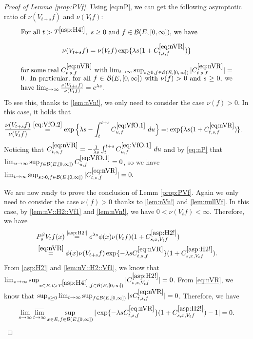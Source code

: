 \documentclass[12pt,a4paper]{amsart}
\numberwithin{equation}{section}
\theoremstyle{plain}
\theoremstyle{definition}
\theoremstyle{remark}
\begin{document}
\begin{proof}[Proof of Lemma \ref{prop:PVf}]
	Using \eqref{eq:nP}, we can get the following asymptotic ratio of $\nu(V_{t+s}f)$ and $\nu(V_tf)$:
\begin{equation} \label{eq:nVR}
\begin{minipage}{0.9\textwidth}
	For all $t> T^{\eqref{asp:H4!}},~s \geq 0$ and $f\in \mathcal B(E,[0,\infty])$, we have \[\nu(V_{t+s}f) = \nu(V_tf) \exp\{\lambda s (1+C^{\eqref{eq:nVR}}_{t,s,f}) \}\] for some real $C^{\eqref{eq:nVR}}_{t,s,f}$ with 
	$\lim_{t\to \infty} \sup_{s\geq  0,f\in \mathcal B(E,[0,\infty])} |C^{\eqref{eq:nVR}}_{t,s,f}| = 0$.
	In particular, for all $f\in \mathcal B(E,[0,\infty])$ with $\nu(f)>0$ and $s\geq 0$, we have $\lim_{t\to \infty} \frac{\nu(V_{t+s}f)}{\nu(V_tf)} = e^{\lambda s}$.
\end{minipage}
\end{equation}
	To see this, thanks to \eqref{lem:nVn!},
	we only need to consider the case $\nu(f)>0$. In this case,  it holds  that
\begin{align}
	&\frac{\nu(V_{t+s} f)} {\nu(V_t f)}
	\overset{\eqref{eq:VfO.2}}= \exp\Big\{\lambda s- \int_t^{t+s} C^{\eqref{eq:VfO.1}}_{u,f} ~du\Big\}
	=: \exp\{\lambda s (1+C^{\eqref{eq:nVR}}_{t,s,f}) \}.
\end{align}
	Noticing that $C^{\eqref{eq:nVR}}_{t,s,f} = -\frac{1}{\lambda s}\int_t^{t+s} C^{\eqref{eq:VfO.1}}_{u,f} ~du$ and by \eqref{eq:nP} that $\lim_{u\to \infty}\sup_{f\in \mathcal B(E,[0,\infty])} C^{\eqref{eq:VfO.1}}_{u,f} = 0$,
	so we have %
	$\lim_{t\to \infty} \sup_{s> 0,f\in \mathcal B(E,[0,\infty])} |C^{\eqref{eq:nVR}}_{t,s,f}| = 0. $
	
	We are now  ready to prove the conclusion of Lemm \ref{prop:PVf}.
	Again we only need to consider the case $\nu(f)>0$ thanks to \eqref{lem:nVn!} and  \eqref{lem:nullVf}.
	In this case, by \eqref{lem:nV::H2::Vf1} and \eqref{lem:nVn!}, we have $0<\nu(V_{t}f)<\infty$.
	Therefore, we have
\begin{align}
	& P_s^\beta V_t f(x)
	\overset{\text{\eqref{asp:H2!}}}= e^{\lambda s} \phi(x) \nu(V_tf) (1+C^{\eqref{asp:H2!}}_{s,x,V_tf})
	\\&\overset{\eqref{eq:nVR}}= \phi(x) \nu(V_{t+s}f) \exp\{-\lambda s C^{\eqref{eq:nVR}}_{t,s,f}\} (1+C^{\eqref{asp:H2!}}_{s,x,V_tf}).
\end{align}
	From \eqref{asp:H2!} and \eqref{lem:nV::H2::Vf1}, we know that $\lim_{s\to \infty} \sup_{x\in E, t> T^{\eqref{asp:H4!}}, f\in \mathcal B(E,[0,\infty])}
	|C^{\eqref{asp:H2!}}_{s,x,V_tf}| = 0$.
	From \eqref{eq:nVR}, we know that $\sup_{s\geq 0} \lim_{t\to \infty} \sup_{f\in \mathcal B(E,[0,\infty])}
	|sC^{\eqref{eq:nVR}}_{t,s,f}| = 0$.
	Therefore, we have
	\[
	\lim_{s\to \infty}\varlimsup_{t\to \infty}\sup_{x\in E, f\in \mathcal B(E,[0,\infty])}
	|\exp\{-\lambda s C^{\eqref{eq:nVR}}_{t,s,f}\} (1+C^{\eqref{asp:H2!}}_{s,x,V_tf})-1| = 0. \qedhere\]
\end{proof}
\end{document}
